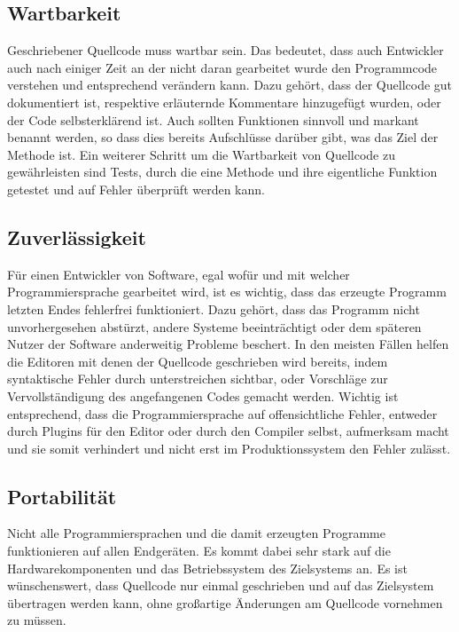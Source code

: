 \subsection{Wartbarkeit}
\label{sec:Wartbarkeit}
Geschriebener Quellcode muss wartbar sein. Das bedeutet, dass auch Entwickler auch nach einiger Zeit an der nicht daran gearbeitet wurde den Programmcode verstehen und entsprechend verändern kann. Dazu gehört, dass der Quellcode gut dokumentiert ist, respektive erläuternde Kommentare hinzugefügt wurden, oder der Code selbsterklärend ist. Auch sollten Funktionen sinnvoll und markant benannt werden, so dass dies bereits Aufschlüsse darüber gibt, was das Ziel der Methode ist. Ein weiterer Schritt um die Wartbarkeit von Quellcode zu gewährleisten sind Tests, durch die eine Methode und ihre eigentliche Funktion getestet und auf Fehler überprüft werden kann.

\subsection{Zuverlässigkeit}
\label{sec:Zuverlässigkeit}
Für einen Entwickler von Software, egal wofür und mit welcher Programmiersprache gearbeitet wird, ist es wichtig, dass das erzeugte Programm letzten Endes fehlerfrei funktioniert. Dazu gehört, dass das Programm nicht unvorhergesehen abstürzt, andere Systeme beeinträchtigt oder dem späteren Nutzer der Software anderweitig Probleme beschert. In den meisten Fällen helfen die Editoren mit denen der Quellcode geschrieben wird bereits, indem syntaktische Fehler durch unterstreichen sichtbar, oder Vorschläge zur Vervollständigung des angefangenen Codes gemacht werden. Wichtig ist entsprechend, dass die Programmiersprache auf offensichtliche Fehler, entweder durch Plugins für den Editor oder durch den Compiler selbst, aufmerksam macht und sie somit verhindert und nicht erst im Produktionssystem den Fehler zulässt.


\subsection{Portabilität}
\label{sec:Portabilität}
Nicht alle Programmiersprachen und die damit erzeugten Programme funktionieren auf allen Endgeräten. Es kommt dabei sehr stark auf die Hardwarekomponenten und das Betriebssystem des Zielsystems an. Es ist  wünschenswert, dass Quellcode nur einmal geschrieben und auf das Zielsystem übertragen werden kann, ohne großartige Änderungen am Quellcode vornehmen zu müssen.


